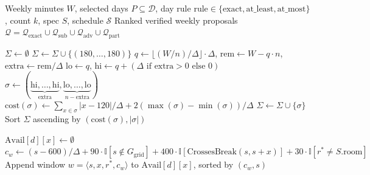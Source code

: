 \documentclass[11pt,a4paper]{article}
\begin{document}
\newpage
\begin{algorithm}[htbp]
\caption{Weekly Smart Planner \& Bounded-DFS Advanced Suggestions (\texttt{schedule\_smart\_weekly.py})}
\label{alg:weekly}
\begin{algorithmic}[1]
\Require Weekly minutes $W$, selected days $P \subseteq \mathcal{D}$, day rule $\text{rule} \in \{\text{exact}, \text{at\_least}, \text{at\_most}\}$, count $k$, spec $S$, schedule $\mathcal{S}$
\Ensure Ranked verified weekly proposals $\mathcal{Q} = \mathcal{Q}_{\text{exact}} \cup \mathcal{Q}_{\text{sub}} \cup \mathcal{Q}_{\text{adv}} \cup \mathcal{Q}_{\text{part}}$

\vspace{0.4em}
\State $\Sigma \gets \emptyset$
        \State $\Sigma \gets \Sigma \cup \{(180, \dots, 180)\}$
        \State $q \gets \lfloor (W / n) / \Delta \rfloor \cdot \Delta$, \quad $\text{rem} \gets W - q \cdot n$, \quad $\text{extra} \gets \text{rem} / \Delta$
        \State $\text{lo} \gets q$, \quad $\text{hi} \gets q + (\Delta \text{ if } \text{extra} > 0 \text{ else } 0)$
            \State $\sigma \gets (\underbrace{\text{hi}, \dots, \text{hi}}_{\text{extra}}, \underbrace{\text{lo}, \dots, \text{lo}}_{n - \text{extra}})$
            \State $\text{cost}(\sigma) \gets \sum_{x \in \sigma} |x - 120|/\Delta + 2(\max(\sigma) - \min(\sigma))/\Delta$
            \State $\Sigma \gets \Sigma \cup \{\sigma\}$
        \EndIf
    \EndIf
\EndFor
\State Sort $\Sigma$ ascending by $(\text{cost}(\sigma), |\sigma|)$

\vspace{0.4em}
    \State $\text{Avail}[d][x] \gets \emptyset$
            \State $c_w \gets (s - 600)/\Delta + 90\cdot\mathbb{I}[s \notin G_{\text{grid}}] + 400\cdot\mathbb{I}[\text{CrossesBreak}(s, s+x)] + 30\cdot\mathbb{I}[r^* \neq S.\text{room}]$
            \State Append window $w = \langle s, x, r^*, c_w \rangle$ to $\text{Avail}[d][x]$, sorted by $(c_w, s)$
        \EndIf
    \EndFor
\EndFor


\end{algorithmic}
\end{algorithm}
\end{document}
